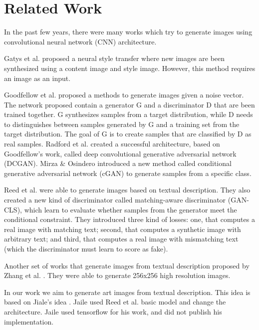 \documentclass[a4paper]{article}
\begin{document}
\section{Related Work} \label{Related_Work}
In the past few years, there were many works which try to generate images using convolutional neural network (CNN) architecture. 

Gatys et al. \cite{gatys2016image} proposed a neural style transfer where new images are been synthesized using a content image and style image. However, this method requires an image as an input. 

Goodfellow et al. \cite{goodfellow2014generative} proposed a methods to generate images given a noise vector. The network proposed contain a generator G and a discriminator D that are been trained together. G synthesizes samples from a target distribution, while D needs to distinguishes between samples generated by G and a training set from the target distribution. The goal of G is to create samples that are classified by D as real samples. 
Radford et al. \cite{radford2015unsupervised} created a successful architecture, based on Goodfellow's work, called deep convolutional generative adversarial network (DCGAN).
Mirza \& Osindero \cite{mirza2014conditional} introduced a new method called conditional generative adversarial network (cGAN) to generate samples from a specific class.

Reed et al. \cite{reed2016generative} were able to generate images based on textual description. They also created a new kind of discriminator called matching-aware discriminator (GAN-CLS), which learn to evaluate whether samples from the generator meet the conditional constraint. They introduced three kind of losses: one, that computes a real image with matching text; second, that computes a synthetic image with arbitrary text; and third, that computes a real image with mismatching text (which the discriminator must learn to score as fake).

Another set of works that generate images from textual description proposed by Zhang et al. \cite{zhang2017stackgan,zhang2017stackgan++}. They were able to generate 256x256 high resolution images.

In our work we aim to generate art images from textual description. This idea is based on Jiale's idea \cite{Zhi2017PixelBrush}. Jaile used Reed et al. \cite{reed2016generative} basic model and change the architecture. Jaile used tensorflow for his work, and did not publish his implementation.
\end{document}
